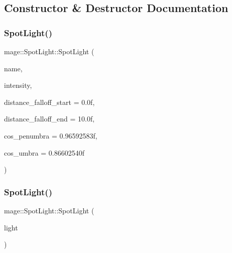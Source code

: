 \subsection{Constructor \& Destructor Documentation}
\hypertarget{classmage_1_1_spot_light_a469dcb9cf484d682982c72e28003e6f7}{}\label{classmage_1_1_spot_light_a469dcb9cf484d682982c72e28003e6f7} 
\subsubsection{\texorpdfstring{Spot\+Light()}{SpotLight()}\hspace{0.1cm}{\footnotesize\ttfamily [1/3]}}
{\footnotesize\ttfamily mage\+::\+Spot\+Light\+::\+Spot\+Light (\begin{DoxyParamCaption}\item[{const string}]{name,  }\item[{const \hyperlink{structmage_1_1_r_g_b_spectrum}{R\+G\+B\+Spectrum} \&}]{intensity,  }\item[{float}]{distance\+\_\+falloff\+\_\+start = {\ttfamily 0.0f},  }\item[{float}]{distance\+\_\+falloff\+\_\+end = {\ttfamily 10.0f},  }\item[{float}]{cos\+\_\+penumbra = {\ttfamily 0.96592583f},  }\item[{float}]{cos\+\_\+umbra = {\ttfamily 0.86602540f} }\end{DoxyParamCaption})\hspace{0.3cm}{\ttfamily [explicit]}}

\hypertarget{classmage_1_1_spot_light_adac6974e9cbfdae4612e2d88229e654d}{}\label{classmage_1_1_spot_light_adac6974e9cbfdae4612e2d88229e654d} 
\subsubsection{\texorpdfstring{Spot\+Light()}{SpotLight()}\hspace{0.1cm}{\footnotesize\ttfamily [2/3]}}
{\footnotesize\ttfamily mage\+::\+Spot\+Light\+::\+Spot\+Light (\begin{DoxyParamCaption}\item[{const \hyperlink{classmage_1_1_spot_light}{Spot\+Light} \&}]{light }\end{DoxyParamCaption})\hspace{0.3cm}{\ttfamily [default]}}

